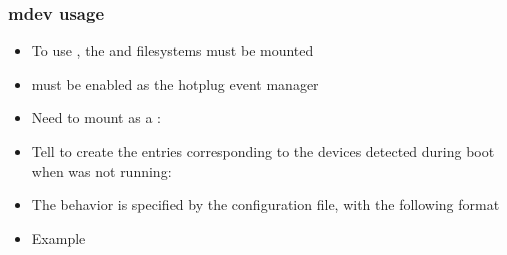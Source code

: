 \begin{frame}
  \frametitle{mdev usage}
  \begin{itemize}
  \item To use , the  and  filesystems must be mounted
  \item {} must be enabled as the hotplug event manager\\
  \item Need to mount  as a :\\
  \item Tell  to create the  entries
    corresponding to the devices detected
    during boot when  was not running:\\
  \item The behavior is specified by the  configuration
    file, with the following format\\
  \item Example\\
  \end{itemize}
\end{frame}

